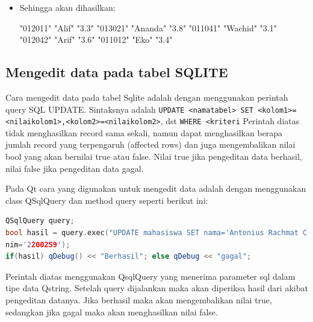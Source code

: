 \begin{itemize}
\begin{lstlisting}[language=c++, caption=Membaca data pada SQLite]
QsqlQuery query.exec("select nim,nama,ipk from mahasiswa order by nim desc");
QString nim,nama;
float ipk;
while(query.next())
{
nim = query.value(0).toString();
nama = query.value(1).toString();
ipk = query.value(2).toFloat();
qDebug() << nim << " " << nama << " " << ipk;
}
\end{lstlisting}

\item Sehingga akan dihasilkan:

\begin{lcverbatim}
"012011"  "Alif"  "3.3"
"013021"  "Ananda"  "3.8" 
"011041" "Wachid"  "3.1" 
"012042"  "Arif"  "3.6" 
"011012"  "Eko"  "3.4" 

\end{lcverbatim}
\end{itemize}



\subsection{Mengedit data pada tabel SQLITE}\label{mengedit-data-pada-tabel-sqlite}

Cara mengedit data pada tabel Sqlite adalah dengan menggunakan perintah
query SQL UPDATE. Sintaksnya adalah
\texttt{UPDATE\ \textless{}namatabel\textgreater{}\ SET\ \textless{}kolom1\textgreater{}=\textless{}nilaikolom1\textgreater{},\textless{}kolom2\textgreater{}=\textless{}nilaikolom2\textgreater{}},
dst \texttt{WHERE\ \textless{}kriteri} Perintah diatas tidak
menghasilkan record sama sekali, namun dapat menghasilkan berapa jumlah
record yang terpengaruh (affected rows) dan juga mengembalikan nilai
bool yang akan bernilai true atau false. Nilai true jika pengeditan data
berhasil, nilai false jika pengeditan data gagal.

Pada Qt cara yang digunakan untuk mengedit data adalah dengan
menggunakan class QSqlQuery dan method query seperti berikut ini:

\begin{lstlisting}[language=c++, caption=menggunakan class QSqlQuery dan method query]
QSqlQuery query;
bool hasil = query.exec("UPDATE mahasiswa SET nama='Antonius Rachmat C' WHERE
nim='2200259');
if(hasil) qDebug() << "Berhasil"; else qDebug << "gagal";
\end{lstlisting}

Perintah diatas menggunakan QsqlQuery yang menerima parameter sql dalam
tipe data Qstring. Setelah query dijalankan maka akan diperiksa hasil
dari akibat pengeditan datanya. Jika berhasil maka akan mengembalikan
nilai true, sedangkan jika gagal maka akan menghasilkan nilai false.

